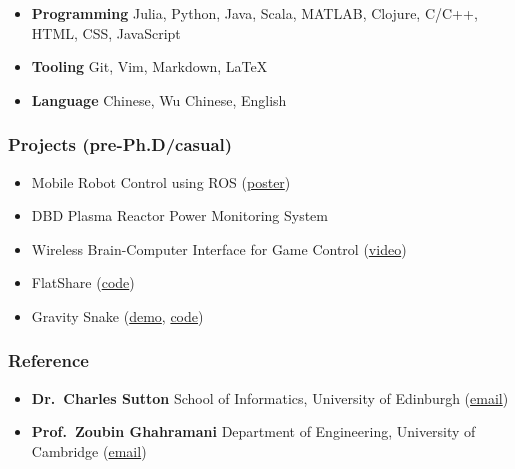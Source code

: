 \documentclass[11pt, a4paper]{article}
\providecommand{\tightlist}{%
  \setlength{\itemsep}{0pt}\setlength{\parskip}{0pt}}
\begin{document}
\begin{raggedright}
\begin{itemize}
\tightlist
\item
  \textbf{Programming} Julia, Python, Java, Scala, MATLAB, Clojure,
  C/C++, HTML, CSS, JavaScript
\item
  \textbf{Tooling} Git, Vim, Markdown, LaTeX
\item
  \textbf{Language} Chinese, Wu Chinese, English
\end{itemize}

\subsubsection{Projects (pre-Ph.D/casual)}

\begin{itemize}
\tightlist
\item
  Mobile Robot Control using ROS
  (\href{./assets/images/fyp.png}{poster})
\item
  DBD Plasma Reactor Power Monitoring System
\item
  Wireless Brain-Computer Interface for Game Control
  (\href{https://www.youtube.com/watch?v=ysmLmQ8NfEY}{video})
\item
  FlatShare (\href{https://github.com/xukai92/flatshare}{code})
\item
  Gravity Snake (\href{http://xuk.ai/gravity_snake/}{demo},
  \href{https://github.com/xukai92/gravity_snake}{code})
\end{itemize}

\subsubsection{Reference}

\begin{itemize}
\tightlist
\item
  \textbf{Dr.~Charles Sutton} School of Informatics, University of
  Edinburgh (\href{mailto:csutton@inf.ed.ac.uk}{email})
\item
  \textbf{Prof.~Zoubin Ghahramani} Department of Engineering, University
  of Cambridge (\href{mailto:zoubin@eng.cam.ac.uk}{email})
\end{itemize}
\end{raggedright}
\end{document}
